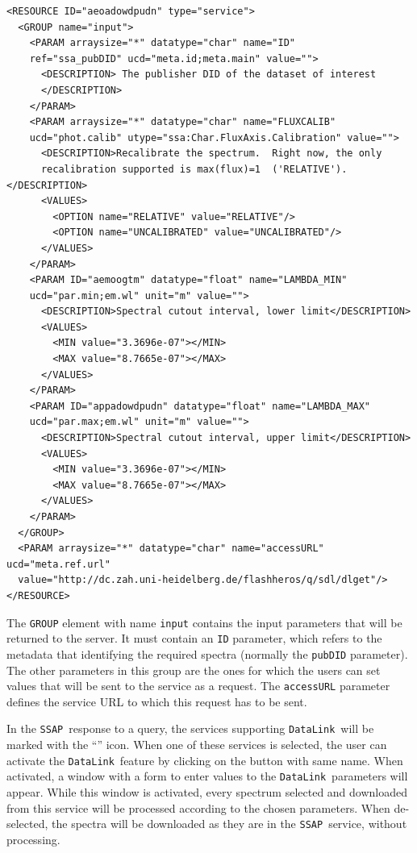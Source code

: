 \documentclass[final,authoryear,5p,times,twocolumn]{elsarticle}
\newcommand{\datalink}{\texttt{DataLink}}
\newcommand{\ssap}{\texttt{SSAP}}
\begin{document}
{\tiny
\begin{minipage}{\textwidth}
\begin{verbatim}
<RESOURCE ID="aeoadowdpudn" type="service">
  <GROUP name="input">
    <PARAM arraysize="*" datatype="char" name="ID"
    ref="ssa_pubDID" ucd="meta.id;meta.main" value="">
      <DESCRIPTION> The publisher DID of the dataset of interest
      </DESCRIPTION>
    </PARAM>
    <PARAM arraysize="*" datatype="char" name="FLUXCALIB"
    ucd="phot.calib" utype="ssa:Char.FluxAxis.Calibration" value="">
      <DESCRIPTION>Recalibrate the spectrum.  Right now, the only
      recalibration supported is max(flux)=1  ('RELATIVE').</DESCRIPTION>
      <VALUES>
        <OPTION name="RELATIVE" value="RELATIVE"/>
        <OPTION name="UNCALIBRATED" value="UNCALIBRATED"/>
      </VALUES>
    </PARAM>
    <PARAM ID="aemoogtm" datatype="float" name="LAMBDA_MIN"
    ucd="par.min;em.wl" unit="m" value="">
      <DESCRIPTION>Spectral cutout interval, lower limit</DESCRIPTION>
      <VALUES>
        <MIN value="3.3696e-07"></MIN>
        <MAX value="8.7665e-07"></MAX>
      </VALUES>
    </PARAM>
    <PARAM ID="appadowdpudn" datatype="float" name="LAMBDA_MAX"
    ucd="par.max;em.wl" unit="m" value="">
      <DESCRIPTION>Spectral cutout interval, upper limit</DESCRIPTION>
      <VALUES>
        <MIN value="3.3696e-07"></MIN>
        <MAX value="8.7665e-07"></MAX>
      </VALUES>
    </PARAM>
  </GROUP>
  <PARAM arraysize="*" datatype="char" name="accessURL" ucd="meta.ref.url"
  value="http://dc.zah.uni-heidelberg.de/flashheros/q/sdl/dlget"/>
</RESOURCE>
\end{verbatim}

\end{minipage}
}

The \texttt{GROUP} element with name \texttt{input} contains the input
parameters that will be returned to the server.  It must contain an \texttt{ID}
parameter, which refers to the metadata that identifying the required
spectra (normally the \texttt{pubDID} parameter).  The other parameters in
this group are the ones for which the users can set values that will
be sent to the service as a request. The \texttt{accessURL} parameter defines
the service URL to which this request has to be sent.

In the \ssap\ response to a query, the services supporting \datalink\ will
be marked with the  ``''  icon. When one of these services is
selected, the user can activate the \datalink\ feature by clicking on
the button with same name. When activated, a window with a form to
enter values to the \datalink\ parameters will appear. While this window
is activated, every spectrum selected and downloaded from this service
will be processed according to the chosen parameters. When
de-selected, the spectra will be downloaded as they are in the \ssap\
service, without processing.
\end{document}
